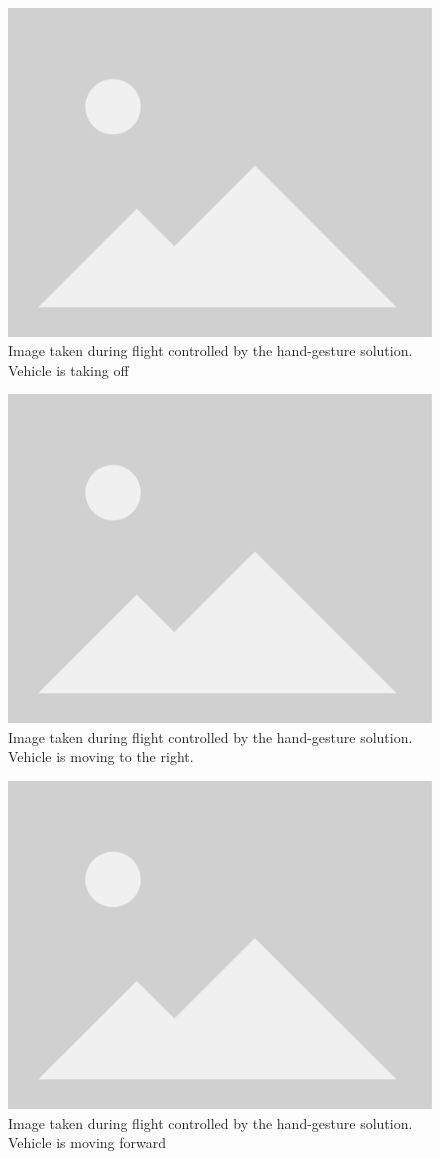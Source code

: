 \begin{figure}
  \centering
  \includegraphics[width=.6\textwidth, keepaspectratio]{img/placeholder.png}
  \caption{Image taken during flight controlled by the hand-gesture solution. Vehicle is taking off}
  \label{fig:flight-test-hand-takeoff}
\end{figure}

\begin{figure}
  \centering
  \includegraphics[width=.6\textwidth, keepaspectratio]{img/placeholder.png}
  \caption{Image taken during flight controlled by the hand-gesture solution. Vehicle is moving to the right.}\label{fig:flight-test-hand-right}
\end{figure}

\begin{figure}
  \centering
  \includegraphics[width=.6\textwidth, keepaspectratio]{img/placeholder.png}
  \caption{Image taken during flight controlled by the hand-gesture solution. Vehicle is moving forward}\label{fig:flight-test-hand-fwd}
\end{figure}

